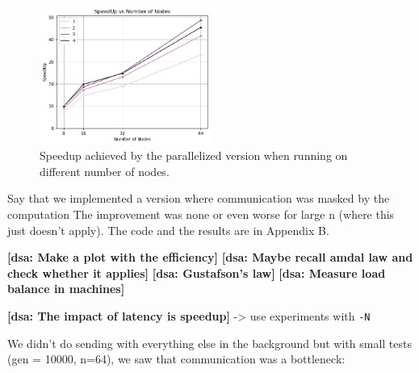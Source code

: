 \documentclass{article}
\newcommand{\dsanote}[1]{\textbf{[dsa: #1]}}
\begin{document}
\begin{figure}[htbp]
    \centering
    \includegraphics[width=0.5\textwidth]{img/speedup.png}
    \caption{Speedup achieved by the parallelized version when running on different number of nodes.}
    \label{speedup-graph}
\end{figure}

Say that we implemented a version where communication was masked by the computation
The improvement was none or even worse for large n (where this just doesn't apply).
The code and the results are in Appendix B.

\dsanote{Make a plot with the efficiency}
\dsanote{Maybe recall amdal law and check whether it applies}
\dsanote{Gustafson's law}
\dsanote{Measure load balance in machines}

\dsanote{The impact of latency is speedup} -> use experiments with \texttt{-N}




We didn't do sending with everything else in the background but with small tests
(gen = 10000, n=64), we saw that communication was a bottleneck:

\end{document}
